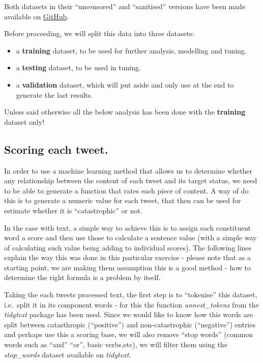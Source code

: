 \documentclass[11pt,]{article}
\providecommand{\tightlist}{%
  \setlength{\itemsep}{0pt}\setlength{\parskip}{0pt}}
\begin{document}
Both datasets in their ``uncensored'' and ``sanitised'' versions have
been made available on
\href{https://github.com/carlosyanez/Tweets_Catastrophe_Classification}{GitHub}.

Before proceeding, we will split this data into three datasets:

\begin{itemize}
\tightlist
\item
  a \textbf{training} dataset, to be used for further analysis,
  modelling and tuning.
\item
  a \textbf{testing} dataset, to be used in tuning.
\item
  a \textbf{validation} dataset, which will put aside and only use at
  the end to generate the last results.
\end{itemize}

Unless said otherwise all the below analysis has been done with the
\textbf{training} dataset only!

\hypertarget{scoring-each-tweet.}{%
\subsection{Scoring each tweet.}\label{scoring-each-tweet.}}

In order to use a machine learning method that allows us to determine
whether any relationship between the content of each tweet and its
target status, we need to be able to generate a function that rates each
piece of content. A way of do this is to generate a numeric value for
each tweet, that then can be used for estimate whether it is
``catastrophic'' or not.

In the case with text, a simple way to achieve this is to assign each
constituent word a score and then use those to calculate a sentence
value (with a simple way of calculating such value being adding to
individual scores). The following lines explain the way this was done in
this particular exercise - please note that as a starting point, we are
making them assumption this is a good method - how to determine the
right formula is a problem by itself.

Taking the each tweets processed text, the first step is to ``tokenise''
this dataset, i.e.~split it in its component words - for this the
function \emph{unnest\_tokens} from the \emph{tidytext} package has been
used. Since we would like to know how this words are split between
catasthropic (``positive'') and non-catastrophic (``negative'') entries
and perhaps use this a scoring base, we will also remove ``stop words''
(common words such as ``and'' ``or'', basic verbs,etc), we will filter
them using the \emph{stop\_words} dataset available on \emph{tidytext}.
\end{document}
